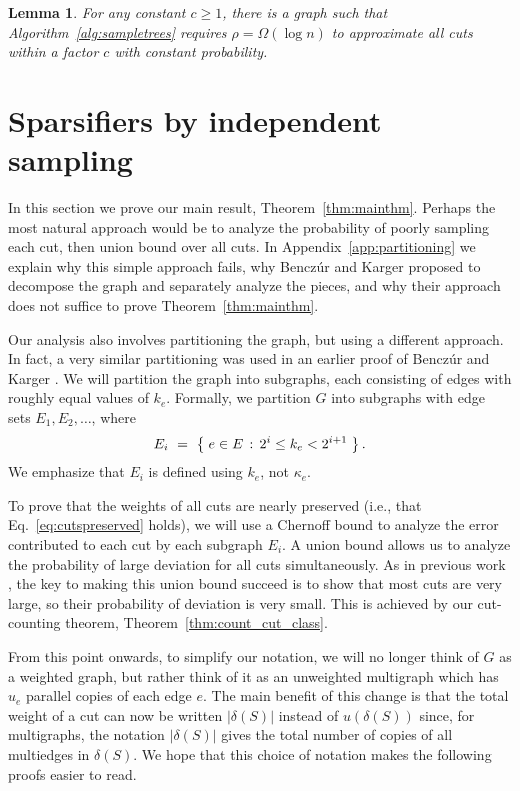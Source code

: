 \documentclass[11pt]{article}
\numberwithin{equation}{section}
\newtheorem{lemma}[theorem]{Lemma}
\newcommand{\Algorithm}[1]{Algorithm~\ref{alg:#1}}
\newcommand{\Appendix}[1]{Appendix~\ref{app:#1}}
\newcommand{\Equation}[1]{Eq.~\eqref{eq:#1}}
\newcommand{\LemmaName}[1]{\label{lem:#1}}
\newcommand{\SectionName}[1]{\label{sec:#1}}
\newcommand{\Theorem}[1]{Theorem~\ref{thm:#1}}
\begin{document}
\begin{lemma}
\LemmaName{sp_tree_lb}
For any constant $c \geq 1$,
there is a graph such that \Algorithm{sampletrees}
requires $\rho = \Omega(\log n)$ to approximate all cuts within a factor $c$
with constant probability.
\end{lemma}







\section{Sparsifiers by independent sampling}
\SectionName{sample_with_connectivity}

In this section we prove our main result, \Theorem{mainthm}.
Perhaps the most natural approach would be to analyze the probability of poorly
sampling each cut, then union bound over all cuts.
In \Appendix{partitioning} we explain why this simple approach fails,
why Bencz\'ur and Karger \cite{BK} proposed to decompose the graph and separately analyze the
pieces,
and why their approach does not suffice to prove \Theorem{mainthm}.

Our analysis also involves partitioning the graph, but using a different approach.
In fact, a very similar partitioning was used in an earlier proof of Bencz\'ur and Karger 
\cite[\S 3.2]{BKConf} \cite[\S 9.3.2]{BenczurThesis}.
We will partition the graph into subgraphs,
each consisting of edges with roughly equal values of $k_e$.
Formally, we partition $G$ into subgraphs with edge sets $E_1, E_2, \ldots$,
where
$$ E_i ~=~ \left\{\;  e \in E  \,:\,  2^i \le k_e < 2^{i+1} \;\right\}. $$
We emphasize that $E_i$ is defined using $k_e$, not $\kappa_e$.

To prove that the weights of all cuts are nearly preserved
(i.e., that \Equation{cutspreserved} holds),
we will use a Chernoff bound to analyze the error contributed to each cut by each subgraph $E_i$.
A union bound allows us to analyze the probability of large deviation
for all cuts simultaneously.
As in previous work \cite{KargerSkel,BK}, 
the key to making this union bound succeed is to show that most cuts are very large,
so their probability of deviation is very small.
This is achieved by our cut-counting theorem, \Theorem{count_cut_class}.

From this point onwards, to simplify our notation, we will no longer think of $G$ as a weighted
graph, but rather think of it as an unweighted multigraph which has
$u_e$ parallel copies of each edge $e$.
The main benefit of this change is that the total weight of a cut
can now be written $|\delta(S)|$ instead of $u(\delta(S))$
since, for multigraphs, the notation $|\delta(S)|$ gives
the total number of copies of all multiedges in $\delta(S)$.
We hope that this choice of notation makes the following proofs easier to read.
\end{document}
